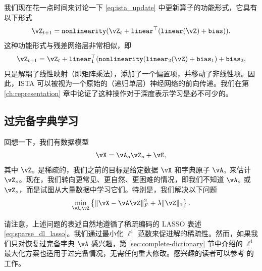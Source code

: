 \documentclass[../../book-main_zh.tex]{subfiles}
\begin{document}
我们现在花一点时间来讨论一下 \eqref{eq:ista_update} 中更新算子的功能形式，它具有以下形式
\begin{equation}
    \vZ_{t + 1} = \texttt{nonlinearity}(\vZ_{t} + \texttt{linear}^{\top}(\texttt{linear}(\vZ) + \texttt{bias})).
\end{equation}
这种功能形式与残差网络层非常相似，即
\begin{equation}
    \vZ_{t + 1} = \vZ_{t} + \texttt{linear}_{1}^{\top}(\texttt{nonlinearity}(\texttt{linear}_{2}(\vZ) + \texttt{bias}_{1}) + \texttt{bias}_{2},
\end{equation}
只是解耦了线性映射（即矩阵乘法），添加了一个偏置项，并移动了非线性项。因此，ISTA 可以被视为一个原始的（递归单层）神经网络的前向传递。我们在第 \ref{ch:representation} 章中论证了这种操作对于深度表示学习是必不可少的。



\subsection{过完备字典学习}

回想一下，我们有数据模型
\begin{equation}
    \vX = \vA_{o}\vZ_{o} + \vE,
\end{equation}
其中 \(\vZ_{o}\) 是稀疏的，我们之前的目标是给定数据 \(\vX\) 和字典原子 \(\vA_{o}\) 来估计 \(\vZ_{o}\)。现在，我们转向更常见、更自然、更困难的情况，即我们不知道 \(\vA_{o}\) 或 \(\vZ_{o}\)，而是试图从大量数据中学习它们。特别是，我们解决以下问题
\begin{equation}
    \min_{\vA, \vZ}\bc{\norm{\vX - \vA\vZ}_{F}^{2} + \lambda \norm{\vZ}_{1}}.
    \label{eqn:DL-overcomplete}
\end{equation}
\begin{remark}
请注意，上述问题的表述自然地遵循了稀疏编码的 LASSO 表述 \eqref{eq:sparse_dl_lasso}。我们通过最小化 $\ell^1$ 范数来促进解的稀疏性。然而，如果我们只对恢复过完备字典 $\vA$ 感兴趣，第 \ref{sec:complete-dictionary} 节中介绍的 $\ell^4$ 最大化方案也适用于过完备情况，无需任何重大修改。感兴趣的读者可以参考 \cite{Qu2020Geometric} 的工作。
\end{remark}
\end{document}
